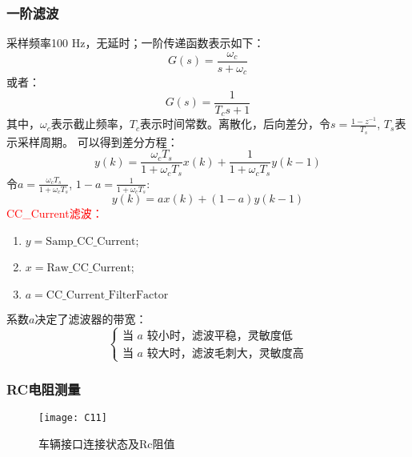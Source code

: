     \subsubsection*{一阶滤波}
        采样频率100 Hz，无延时；一阶传递函数表示如下：
            \begin{equation}
                G(s) = \frac{\omega_c}{s+\omega_c}
                \label{eq:CC2}
            \end{equation}
        或者：
            \begin{equation}
                G(s) = \frac{1}{T_cs+1}
                \label{eq:CC3}
            \end{equation}
        其中，$\omega_c$表示截止频率，$T_c$表示时间常数。离散化，后向差分，令$s = \frac{1-z^{-1}}{T_s}$, $T_s$表示采样周期。
        可以得到差分方程：
            \begin{equation}
                y(k) = \frac{\omega_cT_s}{1+\omega_cT_s}x(k)+\frac{1}{1+\omega_cT_s}y(k-1)
            \end{equation}
        令$a = \frac{\omega_cT_s}{1+\omega_cT_s}$, $1-a = \frac{1}{1+\omega_cT_s} $:
            \begin{equation}
                y(k) = ax(k)+(1-a)y(k-1)
                \label{eq:CC4}
            \end{equation}
        \textcolor{red}{CC\_Current滤波：}
            \begin{enumerate}[label={}]
                \item $y = \mathrm{Samp\_CC\_Current} $;
                \item $x = \mathrm{Raw\_CC\_Current} $;
                \item $a = \mathrm{CC\_Current\_FilterFactor}$
            \end{enumerate}
        系数$a$决定了滤波器的带宽：
            \begin{equation}
                \begin{cases}
                    \text{当 $a$ 较小时，滤波平稳，灵敏度低}\\
                    \text{当 $a$ 较大时，滤波毛刺大，灵敏度高}
                \end{cases}
            \end{equation}
        \subsubsection*{RC电阻测量}

        \begin{figure}[!htbp]
            \centering
            \texttt{[image: C11]}
            \caption{车辆接口连接状态及Rc阻值\cite{GB18487_1}}
            \label{fig:C11}
        \end{figure}


